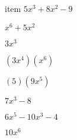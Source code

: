 \documentclass{article}
\begin{document}
\begin{multicols}{2}
item $5x^{3}+8x^2-9$\item $x^{6}+5x^2$\item $3x^{3}$\item $(3x^{4})(x^{6})$\item $(5)(9x^{5})$\item $7x^{3}-8$\item $6x^{5}-10x^{3}-4$\item $10x^{6}$\item 
\end{multicols}
\end{document}
